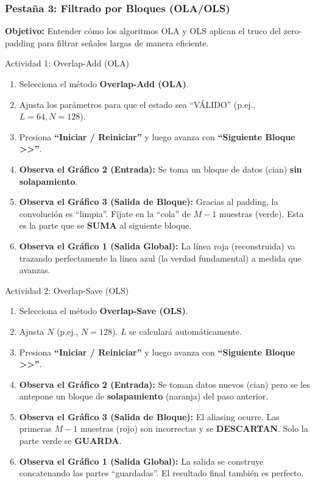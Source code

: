 \documentclass[10pt]{beamer}
\begin{document}
\begin{frame}[allowframebreaks]
  \frametitle{Pestaña 3: Filtrado por Bloques (OLA/OLS)}
  
  \textbf{Objetivo:} Entender cómo los algoritmos OLA y OLS aplican el truco del zero-padding para filtrar señales largas de manera eficiente.
  
  \begin{block}{Actividad 1: Overlap-Add (OLA)}
    \begin{enumerate}[label*=\arabic*.]
      \item Selecciona el método \textbf{Overlap-Add (OLA)}.
      \item Ajusta los parámetros para que el estado sea ``VÁLIDO'' (p.ej., $L=64, N=128$).
      \item Presiona \textbf{“Iniciar / Reiniciar”} y luego avanza con \textbf{“Siguiente Bloque >>”}.
      \item \textbf{Observa el Gráfico 2 (Entrada):} Se toma un bloque de datos (cian) \textbf{sin solapamiento}.
      \item \textbf{Observa el Gráfico 3 (Salida de Bloque):} Gracias al padding, la convolución es ``limpia''. Fíjate en la ``cola'' de $M-1$ muestras (verde). Esta es la parte que se \textbf{SUMA} al siguiente bloque.
      \item \textbf{Observa el Gráfico 1 (Salida Global):} La línea roja (reconstruida) va trazando perfectamente la línea azul (la verdad fundamental) a medida que avanzas.
    \end{enumerate}
  \end{block}
  
  \pause
  
  \begin{block}{Actividad 2: Overlap-Save (OLS)}
    \begin{enumerate}[label*=\arabic*.]
      \item Selecciona el método \textbf{Overlap-Save (OLS)}.
      \item Ajusta $N$ (p.ej., $N=128$). $L$ se calculará automáticamente.
      \item Presiona \textbf{“Iniciar / Reiniciar”} y luego avanza con \textbf{“Siguiente Bloque >>”}.
      \item \textbf{Observa el Gráfico 2 (Entrada):} Se toman datos nuevos (cian) pero se les antepone un bloque de \textbf{solapamiento} (naranja) del paso anterior.
      \item \textbf{Observa el Gráfico 3 (Salida de Bloque):} El aliasing ocurre. Las primeras $M-1$ muestras (rojo) son incorrectas y se \textbf{DESCARTAN}. Solo la parte verde se \textbf{GUARDA}.
      \item \textbf{Observa el Gráfico 1 (Salida Global):} La salida se construye concatenando las partes ``guardadas''. El resultado final también es perfecto.
    \end{enumerate}
  \end{block}
  

\end{frame}
\end{document}
